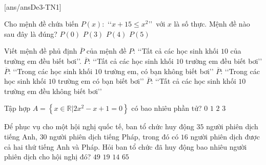 ﻿﻿\begin{name}
	{\tenchude}
	{\tendethi}
	{\tentruong}
	{\thoigian}
\end{name}
\setcounter{ex}{0}\setcounter{bt}{0}
\TN
{}[ans/ansDe3-TN1]
\begin{ex}%
	Cho mệnh đề chứa biến $P(x)\colon$  \lq\lq $x+15 \leq x^2$\rq\rq\, với $x$ là số thực. Mệnh đề nào sau đây là đúng?
	\choice
	{$P(0)$}
	{ $P(3)$}
	{ $P(4)$}
	{\True $P(5)$ }
\end{ex}

\begin{ex}%
	Viết mệnh đề phủ định $\overline P$ của mệnh đề $P$: \lq\lq Tất cả các học sinh khối $10$ của trường em đều biết bơi\rq\rq.
	\choice
	{$\overline P $: \lq\lq Tất cả các học sinh khối $10$ trường em đều biết bơi\rq\rq}
	{\True $\overline P $: \lq\lq Trong các học sinh khối $10$ trường em, có bạn không biết bơi\rq\rq}
	{$\overline P $: \lq\lq Trong các học sinh khối $10$ trường em có bạn biết bơi\rq\rq}
	{$\overline P $: \lq\lq Tất cả các học sinh khối $10$ trường em đều không biết bơi\rq\rq}
\end{ex}

\begin{ex}%
	Tập hợp $A=\left\{x\in \mathbb{R}\big| 2x^2-x+1=0\right\}$ có bao nhiêu phần tử?
	\choice
	{\True $0$}
	{$1$}
	{$2$}
	{$3$}
\end{ex}

\begin{ex}%
	Để phục vụ cho một hội nghị quốc tế, ban tổ chức huy động $35$ người phiên dịch tiếng Anh, $30$ người phiên dịch tiếng Pháp, trong đó có $16$ người phiên dịch được cả hai thứ tiếng Anh và Pháp. Hỏi ban tổ chức đã huy động bao nhiêu người phiên dịch cho hội nghị đó?
	\choice
	{\True $49$}
	{$19$}
	{$14$}
	{$65$}
\end{ex}

